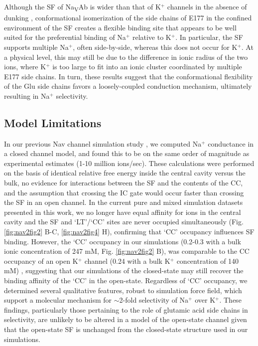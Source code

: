 \begin{refsection}
Although the SF of Na\textsubscript{V}Ab is wider than that of K$^+$ channels in the absence of dunking \cite{Payandeh:2012ib}, conformational isomerization of the side chains of E177 in the confined environment of the SF creates a flexible binding site that appears to be well suited for the preferential binding of Na$^+$ relative to K$^+$. In particular, the SF supports multiple Na$^+$, often side-by-side, whereas this does not occur for K$^+$. At a physical level, this may still be due to the difference in ionic radius of the two ions, where K$^+$ is too large to fit into an ionic cluster coordinated by multiple E177 side chains. In turn, these results suggest that the conformational flexibility of the Glu side chains favors a loosely-coupled conduction mechanism, ultimately resulting in Na$^+$ selectivity.

\subsection{Model Limitations}

In our previous Nav channel simulation study \cite{Chakrabarti:2013kd}, we computed Na$^+$ conductance in a closed channel model, and found this to be on the same order of magnitude as experimental estimates (1-10 million ions/sec). These calculations were performed on the basis of identical relative free energy inside the central cavity versus the bulk, no evidence for interactions between the SF and the contents of the CC, and the assumption that crossing the IC gate would occur faster than crossing the SF in an open channel. In the current pure and mixed simulation datasets presented in this work, we no longer have equal affinity for ions in the central cavity and the SF and `LT'/`CC' sites are never occupied simultaneously (Fig. \ref{fig:nav2fig2} B-C,  \ref{fig:nav2fig4} H), confirming that `CC' occupancy influences SF binding. However, the `CC' occupancy in our simulations (0.2-0.3 with a bulk ionic concentration of 247 mM, Fig. \ref{fig:nav2fig2} B), was comparable to the CC occupancy of an open K$^+$ channel (0.24 with a bulk K$^+$ concentration of 140 mM) \cite{Sumikama:2016kb}, suggesting that our simulations of the closed-state may still recover the binding affinity of the `CC' in the open-state. Regardless of `CC' occupancy, we determined several qualitative features, robust to simulation force field, which support a molecular mechanism for $\sim$2-fold selectivity of Na$^+$ over K$^+$. These findings, particularly those pertaining to the role of glutamic acid side chains in selectivity, are unlikely to be altered in a model of the open-state channel given that the open-state SF is unchanged from the closed-state structure used in our simulations. 


\end{refsection}
